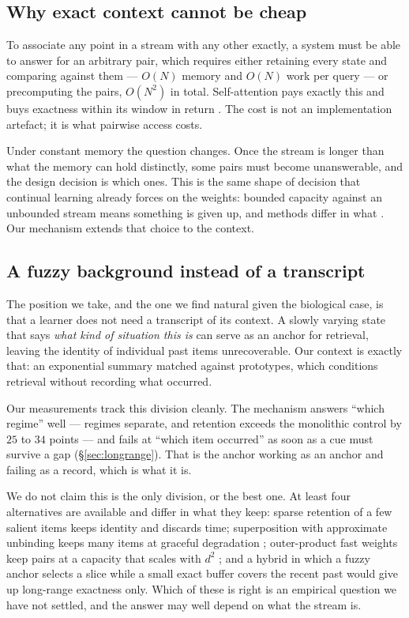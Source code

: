 \documentclass[11pt,a4paper]{article}
\begin{document}
\subsection{Why exact context cannot be cheap}

To associate any point in a stream with any other exactly, a system must be
able to answer for an arbitrary pair, which requires either retaining every
state and comparing against them --- $O(N)$ memory and $O(N)$ work per query
--- or precomputing the pairs, $O(N^2)$ in total. Self-attention pays exactly
this and buys exactness within its window in return
\citep{vaswani2017attention}. The cost is not an implementation artefact; it is
what pairwise access costs.

Under constant memory the question changes. Once the stream is longer than what
the memory can hold distinctly, some pairs must become unanswerable, and the
design decision is which ones. This is the same shape of decision that
continual learning already forces on the weights: bounded capacity against an
unbounded stream means something is given up, and methods differ in what
\citep{kirkpatrick2017overcoming,rusu2016progressive}. Our mechanism extends
that choice to the context.

\subsection{A fuzzy background instead of a transcript}

The position we take, and the one we find natural given the biological case, is
that a learner does not need a transcript of its context. A slowly varying
state that says \emph{what kind of situation this is} can serve as an anchor
for retrieval, leaving the identity of individual past items unrecoverable. Our
context is exactly that: an exponential summary matched against prototypes,
which conditions retrieval without recording what occurred.

Our measurements track this division cleanly. The mechanism answers ``which
regime'' well --- regimes separate, and retention exceeds the monolithic
control by $25$ to $34$ points --- and fails at ``which item occurred'' as soon
as a cue must survive a gap (\S\ref{sec:longrange}). That is the anchor working
as an anchor and failing as a record, which is what it is.

We do not claim this is the only division, or the best one. At least four
alternatives are available and differ in what they keep: sparse retention of a
few salient items keeps identity and discards time; superposition with
approximate unbinding keeps many items at graceful degradation
\citep{plate1995holographic}; outer-product fast weights keep pairs at a
capacity that scales with $d^2$ \citep{ba2016using,schlag2021linear}; and a
hybrid in which a fuzzy anchor selects a slice while a small exact buffer
covers the recent past would give up long-range exactness only. Which of these
is right is an empirical question we have not settled, and the answer may well
depend on what the stream is.
\end{document}
